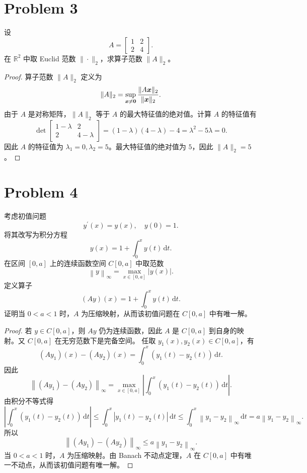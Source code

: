 \section*{Problem 3}

设
\[
A =
\begin{bmatrix}
1 & 2 \\
2 & 4
\end{bmatrix}.
\]
在 $\mathbb{R}^2$ 中取 Euclid 范数 $\|\cdot\|_2$，求算子范数 $\|A\|_2$。

\begin{proof}
算子范数 $\|A\|_2$ 定义为
\[\|A\|_2 = \sup_{\boldsymbol{x} \neq \boldsymbol{0}} \frac{\|A\boldsymbol{x}\|_2}{\|\boldsymbol{x}\|_2}.\]
由于 $A$ 是对称矩阵，$\|A\|_2$ 等于 $A$ 的最大特征值的绝对值。计算 $A$ 的特征值有
\[\det \begin{bmatrix}
1 - \lambda & 2 \\
2 & 4 - \lambda
\end{bmatrix} = (1 - \lambda)(4 - \lambda) - 4 = \lambda^2 - 5\lambda = 0.\]
因此 $A$ 的特征值为 $\lambda_1 = 0, \lambda_2 = 5$。最大特征值的绝对值为 $5$，因此 $\|A\|_2 = \boxed{5}$。


\end{proof}
\section*{Problem 4}

考虑初值问题
\[
y^\prime \left(x\right) = y\left(x\right),\quad y\left(0\right) = 1.
\]
将其改写为积分方程
\[
y\left(x\right) = 1 + \int_0^x y\left(t\right)\, \mathrm{d} t.
\]
在区间 $[0,a]$ 上的连续函数空间 $C\left[0,a\right]$ 中取范数
\[
\left\|y\right\|_\infty = \max_{x \in \left[0,a\right]} \left|y\left(x\right)\right|.
\]
定义算子
\[
\left(Ay\right)\left(x\right) = 1 + \int_0^x y\left(t\right)\, \mathrm{d} t.
\]
证明当 $0 < a < 1$ 时，$A$ 为压缩映射，从而该初值问题在 $C\left[0,a\right]$ 中有唯一解。

\begin{proof}
若 $y\in C[0,a]$，则 $Ay$ 仍为连续函数，因此 $A$ 是 $C[0,a]$ 到自身的映射。又 $C[0,a]$ 在无穷范数下是完备空间。
任取 $y_1 \left(x\right), y_2 \left(x\right) \in C\left[0,a\right]$，有
\[
\left(Ay_1\right)\left(x\right) - \left(Ay_2\right)\left(x\right) = \int_0^x \left(y_1\left(t\right) - y_2\left(t\right)\right)\, \mathrm{d} t.
\]
因此
\[
\left\|\left(Ay_1\right) - \left(Ay_2\right)\right\|_\infty = \max_{x \in \left[0,a\right]} \left|\int_0^x \left(y_1\left(t\right) - y_2\left(t\right)\right)\, \mathrm{d} t\right|.
\]
由积分不等式得
\[
\left|\int_0^x \left(y_1\left(t\right) - y_2\left(t\right)\right)\, \mathrm{d} t\right| \leq \int_0^x \left|y_1\left(t\right) - y_2\left(t\right)\right|\, \mathrm{d} t \leq \int_0^x \left\|y_1 - y_2\right\|_\infty \, \mathrm{d} t = a \left\|y_1 - y_2\right\|_\infty.
\]
所以
\[
\left\|\left(Ay_1\right) - \left(Ay_2\right)\right\|_\infty \leq a \left\|y_1 - y_2\right\|_\infty.
\]
当 $0 < a < 1$ 时，$A$ 为压缩映射。由 Banach 不动点定理，$A$ 在 $C[0,a]$ 中有唯一不动点，从而该初值问题有唯一解。
\end{proof}
